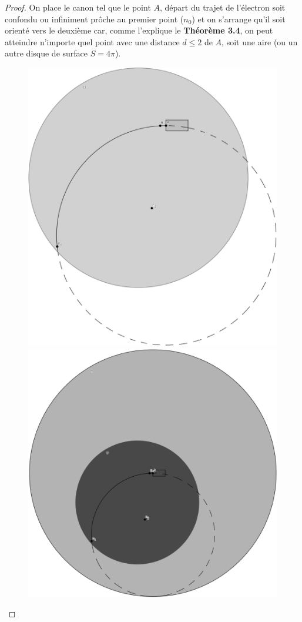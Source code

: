 \documentclass{amsart}
\theoremstyle{definition}
\theoremstyle{remark}
\numberwithin{equation}{section}
\begin{document}
\begin{proof}
  On place le canon tel que le point $A$, départ du trajet de l'électron soit confondu ou infiniment prôche au premier point ($n_0$) et on s'arrange qu'il soit orienté vers le deuxième car, comme l'explique le \textbf{Théorème 3.4}, on peut atteindre n'importe quel point avec une distance $d\leq2$ de $A$, soit une aire (ou un autre disque de surface $S=4\pi$).

  \begin{figure}[H]
    \centering
    \includegraphics[scale=0.105]{images/q3.png}
    \includegraphics[scale=0.105]{images/q3_generalization.png}

\end{figure}
\end{proof}
\end{document}
